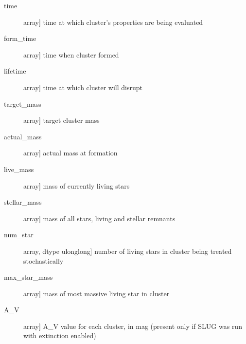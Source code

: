 \documentclass[letterpaper,10pt,english]{sphinxmanual}
\begin{document}
\begin{fulllineitems}
\begin{description}
\begin{description}
\item[{time}] \leavevmode{[}array{]}
time at which cluster's properties are being evaluated

\item[{form\_time}] \leavevmode{[}array{]}
time when cluster formed

\item[{lifetime}] \leavevmode{[}array{]}
time at which cluster will disrupt

\item[{target\_mass}] \leavevmode{[}array{]}
target cluster mass

\item[{actual\_mass}] \leavevmode{[}array{]}
actual mass at formation

\item[{live\_mass}] \leavevmode{[}array{]}
mass of currently living stars

\item[{stellar\_mass}] \leavevmode{[}array{]}
mass of all stars, living and stellar remnants

\item[{num\_star}] \leavevmode{[}array, dtype ulonglong{]}
number of living stars in cluster being treated stochastically

\item[{max\_star\_mass}] \leavevmode{[}array{]}
mass of most massive living star in cluster

\item[{A\_V}] \leavevmode{[}array{]}
A\_V value for each cluster, in mag (present only if SLUG was
run with extinction enabled)

\end{description}

\end{description}

\end{fulllineitems}

\end{document}
